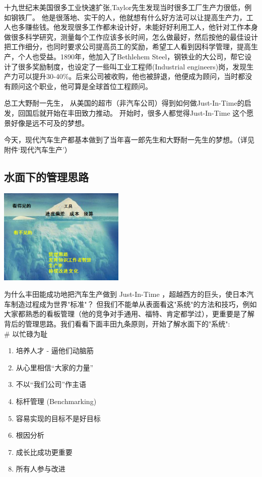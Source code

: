 {\begin{minipage}[t]{0.97\columnwidth}
十九世纪末美国很多工业快速扩张,Taylor先生发现当时很多工厂生产力很低，例如钢铁厂。
他是很落地、实干的人，他就想有什么好方法可以让提高生产力，工人也多赚些钱。他发现很多工作都未设计好，未能好好利用工人，他针对工作本身做很多科学研究，测量每个工作应该多长时间，怎么做最好，然后按他的最佳设计把工作细分，也同时要求公司提高员工的奖励，希望工人看到因科学管理，提高生产，个人也受益。1890年，他加入了Bethlehem
Steel，钢铁业的大公司，帮它设计了很多奖励制度，也设定了一些叫工业工程师(Industrial
engineers)岗，发现生产力可以提升30-40\%。后来公司被收购，他也被辞退，他便成为顾问，当时都没有顾问这个职业，他可算是全球首位工程顾问。
\strut
\end{minipage}}

总工大野耐一先生，
从美国的超市（非汽车公司）得到如何做Just-In-Time的启发，回国后就开始在丰田致力推动。
开始时，很多人都觉得Just-In-Time 这个愿景好像是远不可及的梦想。

今天，现代汽车生产都基本做到了当年喜一郎先生和大野耐一先生的梦想。（详见附件`现代汽车生产'）

\hypertarget{ux6c34ux9762ux4e0bux7684ux7ba1ux7406ux601dux8def}{%
\subsection{水面下的管理思路}\label{ux6c34ux9762ux4e0bux7684ux7ba1ux7406ux601dux8def}}


\includegraphics[width=6cm]{冰山.png}

为什么丰田能成功地把汽车生产做到 Just-In-Time
，超越西方的巨头，使日本汽车制造过程成为世界"标准"？
但我们不能单从表面看这"系统"的方法和技巧，例如大家都熟悉的看板管理（他的竞争对手通用、福特、肯定都学过），更重要是了解背后的管理思路。我们看看下面丰田九条原则，开始了解水面下的"系统":\\
\# 以忙碌为耻

\begin{enumerate}
\tightlist
\item
  培养人才 - 逼他们动脑筋
\item
  从心里相信``大家的力量''
\item
  不以``我们公司''作主语
\item
  标杆管理 (Benchmarking)
\item
  容易实现的目标不是好目标
\item
  根因分析
\item
  成长比成功更重要
\item
  所有人参与改进
\end{enumerate}

